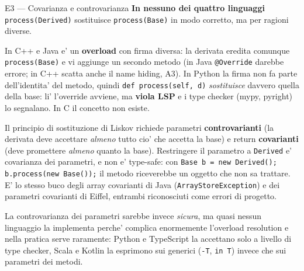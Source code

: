 \documentclass{report}
\newcommand{\code}[1]{\texttt{\small #1}}
\begin{document}
\begin{soluzione}{E3 --- Covarianza e controvarianza}
\label{sol:E3}
\textbf{In nessuno dei quattro linguaggi} \code{process(Derived)} sostituisce
\code{process(Base)} in modo corretto, ma per ragioni diverse.

In C++ e Java e' un \textbf{overload} con firma diversa: la derivata eredita
comunque \code{process(Base)} e vi aggiunge un secondo metodo (in Java
\code{@Override} darebbe errore; in C++ scatta anche il name hiding, A3). In
Python la firma non fa parte dell'identita' del metodo, quindi
\code{def process(self, d)} \emph{sostituisce} davvero quella della base: li'
l'override avviene, ma \textbf{viola LSP} e i type checker (mypy, pyright) lo
segnalano. In C il concetto non esiste.

Il principio di sostituzione di Liskov richiede parametri
\textbf{controvarianti} (la derivata deve accettare \emph{almeno} tutto cio' che
accetta la base) e return \textbf{covarianti} (deve promettere \emph{almeno}
quanto la base). Restringere il parametro a \code{Derived} e' covarianza dei
parametri, e non e' type-safe: con
\code{Base b = new Derived(); b.process(new Base());} il metodo riceverebbe un
oggetto che non sa trattare. E' lo stesso buco degli array covarianti di Java
(\code{ArrayStoreException}) e dei parametri covarianti di Eiffel, entrambi
riconosciuti come errori di progetto.

La controvarianza dei parametri sarebbe invece \emph{sicura}, ma quasi nessun
linguaggio la implementa perche' complica enormemente l'overload resolution e
nella pratica serve raramente: Python e TypeScript la accettano solo a livello
di type checker, Scala e Kotlin la esprimono sui generici (\code{-T}, \code{in T})
invece che sui parametri dei metodi.
\end{soluzione}
\end{document}
